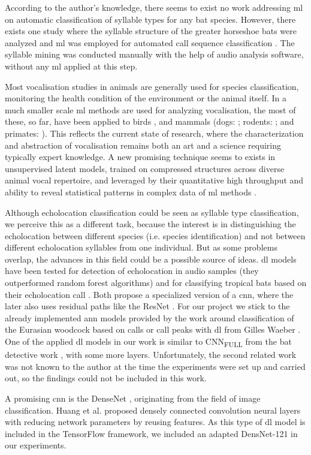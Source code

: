 According to the author's knowledge, there seems to exist no work addressing \gls{ml} on automatic classification of syllable types for any bat species. However, there exists one study where the syllable structure of the greater horseshoe bats were analyzed and \gls{ml} was employed for automated call sequence classification \cite{Zhang2019}. The syllable mining was conducted manually with the help of audio analysis software, without any \gls{ml} applied at this step.

Most vocalisation studies in animals are generally used for species classification, monitoring the health condition of the environment or the animal itself.
In a much smaller scale \gls{ml} methods are used for analyzing vocalisation, the most of these, so far, have been applied to birds \cite{Qian2017,Tchernichovski2004}, and mammals (dogs: \cite{Molnar2008}; rodents: \cite{Coffey2019}; and primates: \cite{Pozzi2010,Turesson2016}).
This reflects the current state of research, where the characterization and abstraction of vocalisation remains both an art and a science requiring typically expert knowledge. A new promising technique seems to exists in unsupervised latent models, trained on compressed structures across diverse animal vocal repertoire, and leveraged by their quantitative high throughput and ability to reveal statistical patterns in complex data of \gls{ml} methods \cite{Sainburg2020}.

Although echolocation classification could be seen as syllable type classification, we perceive this as a different task, because the interest is in distinguishing the echolocation between different species (i.e. species identification) and not between different echolocation syllables from one individual.
But as some problems overlap, the advances in this field could be a possible source of ideas.
\Gls{dl} models have been tested for detection of echolocation in audio samples (they outperformed random forest algorithms) \cite{MacAodha2018} and for classifying tropical bats based on their echolocation call \cite{Chen2020}.
Both propose a specialized version of a \gls{cnn}, where the later also uses residual paths like the ResNet \cite{He2016}.
For our project we stick to the already implemented \gls{ann} models provided by the work around classification of the Eurasian woodcock based on calls or call peaks with \gls{dl} from Gilles Waeber \cite{Waeber2019BirdLearning}. One of the applied \gls{dl} models in our work is similar to CNN\textsubscript{FULL} from the bat detective work \cite{MacAodha2018}, with some more layers. Unfortunately, the second related work was not known to the author at the time the experiments were set up and carried out, so the findings could not be included in this work.

A promising \gls{cnn} is the DenseNet \cite{Huang2017a}, originating from the field of image classification.
Huang et al. proposed densely connected convolution neural layers with reducing network parameters by reusing features.
As this type of \gls{dl} model is included in the TensorFlow framework, we included an adapted DensNet-121 in our experiments.
